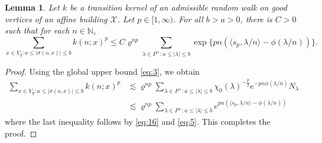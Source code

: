 \documentclass[11pt]{amsart}
\newcommand{\NN}{\mathbb{N}}
\newcommand{\scrX}{\mathscr{X}}
\newcommand{\sprod}[2]{\langle {#1}, {#2} \rangle}
\theoremstyle{plain}
\newtheorem{lemma}[theorem]{Lemma}
\theoremstyle{definition}
\numberwithin{equation}{section}
\begin{document}
\begin{lemma}
	\label{lem:4}
	Let $k$ be a transition kernel of an admissible random walk on good vertices of an affine building $\scrX$.
	Let $p \in [1, \infty)$. For all $b > a > 0$, there is $C > 0$ such that for each $n \in \NN$,
	\[
		\sum_{x \in V_g : a\leqslant |\sigma(o,x)|\leqslant b} k(n; x)^p
		\leqslant
		C
		\varrho^{np} \sum_{\lambda \in P^+ : a\leqslant |\lambda|\leqslant b}
		\exp\Big\{p n (\sprod{s_p}{\lambda/n} - \phi(\lambda/n))\Big\}.
	\]
\end{lemma}
\begin{proof}
	Using the global upper bound \eqref{eq:3}, we obtain 
	\begin{align*}
		\nonumber
		\sum_{x \in V_g : a\leqslant |\sigma(o,x)|\leqslant b}
		k(n; x)^p
		&\lesssim 
		\varrho^{np} \sum_{\lambda \in P^+ : a \leqslant |\lambda|\leqslant b} 
		\chi_0(\lambda )^{-\frac{p}{2}}  e^{-pn \phi(\lambda/n)} N_\lambda 
		\\
		&\lesssim
		\varrho^{np} \sum_{\lambda \in P^+ : a\leqslant |\lambda|\leqslant b}  
		e^{p n (\sprod{s_p}{\lambda/n} - \phi(\lambda/n))}
	\end{align*}
	where the last inequality follows by \eqref{eq:16} and \eqref{eq:5}. This completes the proof.
\end{proof}
\end{document}
